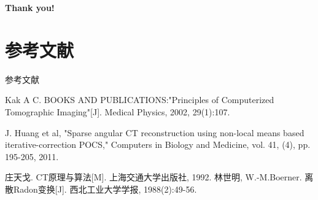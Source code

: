 \documentclass{beamer}
\begin{document}
  \begin{frame}
    \begin{center}
      \Huge{\bf{Thank you!}}
    \end{center}
  \end{frame} %
  \section{参考文献}
  \begin{frame}{参考文献}
    \begin{thebibliography}{0}
      
      Kak A C. BOOKS AND PUBLICATIONS:"Principles of Computerized Tomographic Imaging"[J]. Medical Physics, 2002, 29(1):107.
      
      J. Huang et al, "Sparse angular CT reconstruction using non-local means based iterative-correction POCS," Computers in Biology and Medicine, vol. 41, (4), pp. 195-205, 2011.
      
      庄天戈. CT原理与算法[M]. 上海交通大学出版社, 1992.
      林世明, W.-M.Boerner. 离散Radon变换[J]. 西北工业大学学报, 1988(2):49-56.
      \end{thebibliography}
  \end{frame} %


\end{document}
